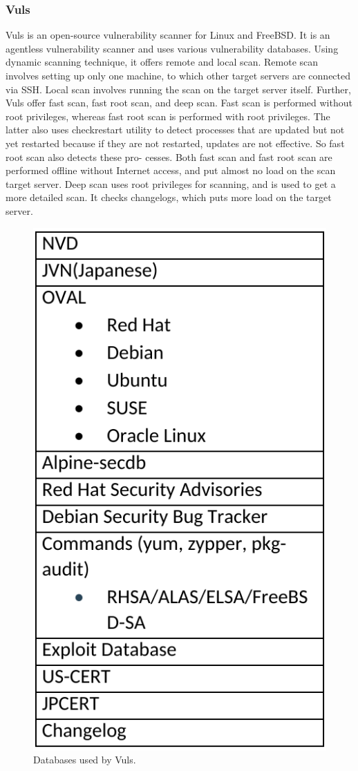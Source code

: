 \documentclass[a4paper,num-refs]{oup-contemporary}
\begin{document}
\subsubsection{Vuls}

Vuls is an open-source vulnerability scanner for Linux and FreeBSD.
It is an agentless vulnerability scanner and uses various
vulnerability databases. Using dynamic scanning technique, it offers
remote and local scan. Remote scan involves setting up only one machine, to
which other target servers are connected via SSH. Local scan involves running
the scan on the target server itself. Further, Vuls offer fast scan, fast root scan,
and deep scan.
Fast scan is performed without root privileges, whereas fast root scan is
performed with root privileges. The latter also uses checkrestart utility to 
detect processes that are updated but not yet restarted because if they are not
restarted, updates are not effective. So fast root scan also detects these pro-
cesses. Both fast scan and fast root scan are performed offline without Internet
access, and put almost no load on the scan target server. Deep scan uses
root privileges for scanning, and is used to get a more detailed scan. It checks
changelogs, which puts more load on the target server.

\begin{figure}
  \centering
  \includegraphics[width=.7\columnwidth]{Figures/vuls.png}
  \caption{Databases used by Vuls.}
	\label{fig:vuls_db}
\end{figure}
\end{document}

